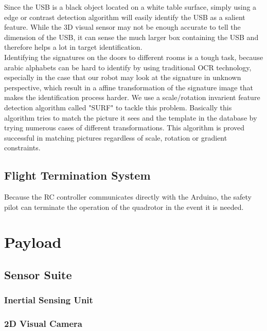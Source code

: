 \documentclass[12pt, letterpaper]{article}
\begin{document}
Since the USB is a black object located on a white table surface, simply using a edge or contrast detection algorithm will easily identify the USB as a salient feature. While the 3D visual sensor may not be enough accurate to tell the dimension of the USB, it can sense the much larger box containing the USB and therefore helps a lot in target identification. 
\\
Identifying the signatures on the doors to different rooms is a tough task, because arabic alphabets can be hard to identify by using traditional OCR technology, especially in the case that our robot may look at the signature in unknown perspective, which result in a affine transformation of the signature image that makes the identification process harder. We use a scale/rotation invarient feature detection algorithm called "SURF" to tackle this problem. Basically this algorithm tries to match the picture it sees and the template in the database by trying numerous cases of different transformations. This algorithm is proved successful in matching pictures regardless of scale, rotation or gradient constraints.
\\
\subsection{Flight Termination System}
Because the RC controller communicates directly with the Arduino, the safety pilot can terminate the operation of the quadrotor in the event it is needed.


\section{Payload}
\subsection{Sensor Suite}

\subsubsection{Inertial Sensing Unit}


\subsubsection{2D Visual Camera}
\end{document}
